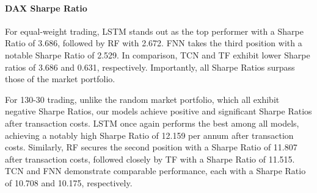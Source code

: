 \documentclass{article}
\begin{document}
\paragraph{DAX Sharpe Ratio}
For equal-weight trading, LSTM stands out as the top performer with a Sharpe Ratio of 3.686, followed by RF with 2.672. FNN takes the third position with a notable Sharpe Ratio of 2.529. In comparison, TCN and TF exhibit lower Sharpe ratios of 3.686 and 0.631, respectively. Importantly, all Sharpe Ratios surpass those of the market portfolio.

For 130-30 trading, unlike the random market portfolio, which all exhibit negative Sharpe Ratios, our models achieve positive and significant Sharpe Ratios after transaction costs. LSTM once again performs the best among all models, achieving a notably high Sharpe Ratio of 12.159 per annum after transaction costs. Similarly, RF secures the second position with a Sharpe Ratio of 11.807 after transaction costs, followed closely by TF with a Sharpe Ratio of 11.515. TCN and FNN demonstrate comparable performance, each with a Sharpe Ratio of 10.708 and 10.175, respectively.
\end{document}
